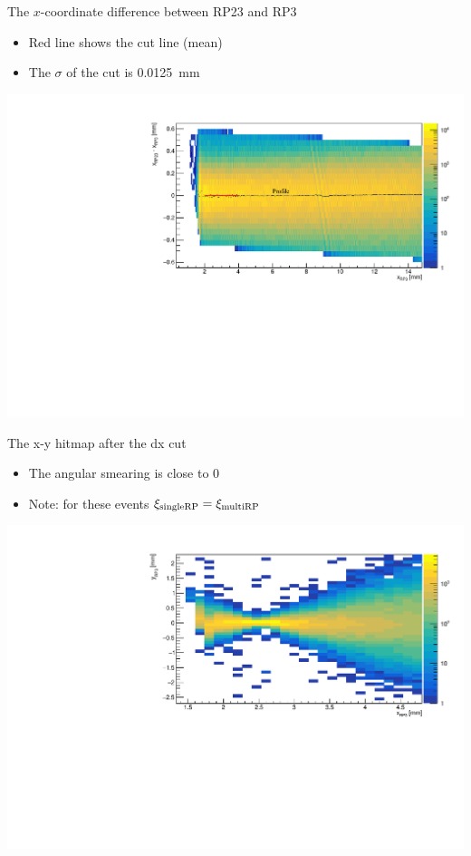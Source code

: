 \documentclass{beamer}
\begin{document}
\begin{frame}\scriptsize
	\begin{block}{The $x$-coordinate difference between RP23 and RP3}
    		\begin{itemize}
			\item Red line shows the cut line (mean)
			\item The $\sigma$ of the cut is 0.0125~mm
		\end{itemize}
             \includegraphics[width=1.0\textwidth]{dxrp23rp3.pdf}\\
	\end{block}
	
\end{frame}

\begin{frame}\scriptsize
	\begin{block}{The x-y hitmap after the dx cut}
    		\begin{itemize}
			\item The angular smearing is close to 0
			\item Note: for these events $\xi_{\rm singleRP}=\xi_{\rm multiRP}$
		\end{itemize}
             \includegraphics[width=1.0\textwidth]{RP3_after_cut.pdf}\\
	\end{block}
	
\end{frame}
\end{document}
